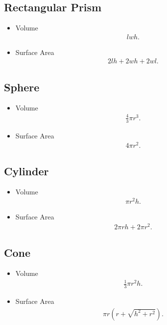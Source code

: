 \documentclass{report}
\begin{document}
    \bigbreak \noindent \bigbreak \noindent 
    \subsection{Rectangular Prism}
    \begin{itemize}
      \item Volume
        \begin{align*}
          lwh
        .\end{align*}
      \item Surface Area
        \begin{align*}
          2lh + 2wh + 2wl
        .\end{align*}
    \end{itemize}

    \bigbreak \noindent \bigbreak \noindent 
    \subsection{Sphere}
    \begin{itemize}
      \item Volume
        \begin{align*}
          \frac{4}{3}\pi r^{3}
        .\end{align*}
      \item Surface Area
        \begin{align*}
          4\pi r^{2}
        .\end{align*}
    \end{itemize}

    \bigbreak \noindent \bigbreak \noindent 
    \subsection{Cylinder}
    \begin{itemize}
      \item Volume
        \begin{align*}
          \pi r^{2}h
        .\end{align*}
      \item Surface Area
        \begin{align*}
          2 \pi rh + 2\pi r^{2}
        .\end{align*}
    \end{itemize}

    \bigbreak \noindent \bigbreak \noindent 
    \subsection{Cone}
    \begin{itemize}
      \item Volume
        \begin{align*}
          \frac{1}{3}\pi r^{2}h
        .\end{align*}
      \item Surface Area
        \begin{align*}
          \pi r (r+ \sqrt{h^{2}+r^{2}})
        .\end{align*}
    \end{itemize}
\end{document}
